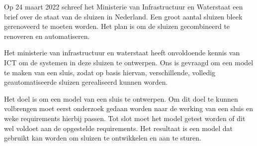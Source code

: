 \documentclass[../verslag.tex]{subfiles}
\begin{document}
Op 24 maart 2022 schreef het Ministerie van Infrastructuur en Waterstaat een brief over de staat van de sluizen in Nederland. Een groot aantal sluizen bleek gerenoveerd te moeten worden. Het plan is om de sluizen gecombineerd te renoveren en automatiseren.

Het ministerie van infrastructuur en waterstaat heeft onvoldoende kennis van ICT om de systemen in deze sluizen te ontwerpen. Ons is gevraagd om een model te maken van een sluis, zodat op basis hiervan, verschillende, volledig geautomatiseerde sluizen gerealiseerd kunnen worden.

Het doel is om een model van een sluis te ontwerpen. Om dit doel te kunnen volbrengen moet eerst onderzoek gedaan worden naar de werking van een sluis en weke requirements hierbij passen. Tot slot moet het model getest worden of dit wel voldoet aan de opgestelde requirements. Het resultaat is een model dat gebruikt kan worden om sluizen te ontwikkelen en aan te sturen.
\end{document}
